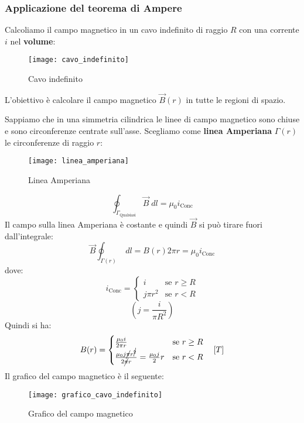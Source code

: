\documentclass[a4paper]{article}
\begin{document}
\subsubsection{Applicazione del teorema di Ampere}
\begin{example}
  Calcoliamo il campo magnetico in un cavo indefinito di raggio \( R \) con una corrente
  \( i \) nel \textbf{volume}:
  \begin{figure}[H]
    \centering
    \texttt{[image: cavo\_indefinito]}
    \caption{Cavo indefinito}
  \end{figure}
  \noindent
  L'obiettivo è calcolare il campo magnetico \( \vec{B}(r) \) in tutte le regioni di spazio.

  \vspace{1em}
  \noindent
  Sappiamo che in una simmetria cilindrica le linee di campo magnetico sono chiuse e sono
  circonferenze centrate sull'asse.
  Scegliamo come \textbf{linea Amperiana} \( \Gamma(r) \) le circonferenze di raggio \( r \):
  \begin{figure}[H]
    \centering
    \texttt{[image: linea\_amperiana]}
    \caption{Linea Amperiana}
  \end{figure}
  \[
    \oint_{\Gamma_{\text{Qualsiasi}}} \vec{B} \; dl = \mu_0 i_{\text{Conc}}
  \] 
  Il campo sulla linea Amperiana è costante e quindi \( \vec{B} \) si può tirare fuori
  dall'integrale:
  \[
    \vec{B} \oint_{\Gamma(r)} \; dl = B(r) 2 \pi r = \mu_0 i_{\text{Conc}}
  \] 
  dove:
  \[
    i_{\text{Conc}} = \begin{cases}
      i & \text{se } r \ge R \\
      j \pi r^2 & \text{se } r < R
    \end{cases}
  \] 
  \[
   \left( j = \frac{i}{\pi R^2} \right) 
  \] 
  Quindi si ha:
  \[
    B(r) = \begin{cases}
      \frac{\mu_0 i}{2 \pi r} & \text{se } r \ge R \\
      \frac{\mu_0 j \cancel{\pi} r^{\cancel{2}}}{2 \cancel{\pi} r} = \frac{\mu_0 j}{2} r & \text{se } r < R
    \end{cases}
    \quad \left[ T \right]
  \] 
  Il grafico del campo magnetico è il seguente:
  \begin{figure}[H]
    \centering
    \texttt{[image: grafico\_cavo\_indefinito]}
    \caption{Grafico del campo magnetico}
  \end{figure}
\end{example}
\end{document}
